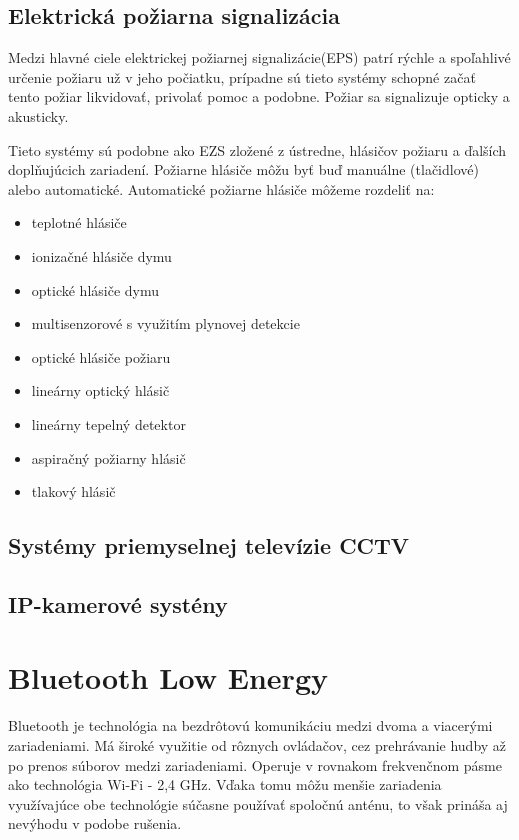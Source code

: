 \section{Elektrická požiarna signalizácia}

Medzi hlavné ciele elektrickej požiarnej signalizácie(EPS) patrí rýchle a spoľahlivé určenie požiaru už v jeho počiatku, prípadne sú tieto systémy schopné začať tento požiar likvidovať, privolať pomoc a podobne. Požiar sa signalizuje opticky a akusticky.

Tieto systémy sú podobne ako EZS zložené z ústredne, hlásičov požiaru a ďalších doplňujúcich zariadení. Požiarne hlásiče môžu byť buď manuálne (tlačidlové) alebo automatické.
Automatické požiarne hlásiče môžeme rozdeliť na:
\begin{itemize}
    \item teplotné hlásiče
    \item ionizačné hlásiče dymu
    \item optické hlásiče dymu
    \item multisenzorové s využitím plynovej detekcie
    \item optické hlásiče požiaru
    \item lineárny optický hlásič
    \item lineárny tepelný detektor
    \item aspiračný požiarny hlásič
    \item tlakový hlásič\cite{Krecek}
\end{itemize}

\section{Systémy priemyselnej televízie CCTV}

\section{IP-kamerové systény}

\chapter{Bluetooth Low Energy}

Bluetooth je technológia na bezdrôtovú komunikáciu medzi dvoma a viacerými zariadeniami. Má široké využitie od rôznych ovládačov, cez prehrávanie hudby až po prenos súborov medzi zariadeniami. Operuje v rovnakom frekvenčnom pásme ako technológia Wi-Fi - 2,4 GHz. Vďaka tomu môžu menšie zariadenia využívajúce obe technológie súčasne používať spoločnú anténu, to však prináša aj nevýhodu v podobe rušenia.

